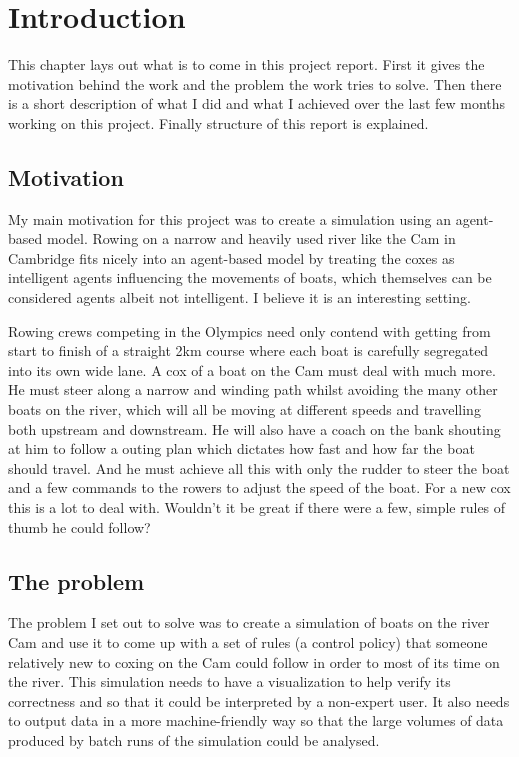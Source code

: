 \chapter{Introduction}\label{chapter:intro}
  This chapter lays out what is to come in this project report. First it gives the motivation behind the work and the problem the work tries to solve. Then there is a short description of what I did and what I achieved over the last few months working on this project. Finally structure of this report is explained.

  \section{Motivation}
  My main motivation for this project was to create a simulation using an agent-based model. Rowing on a narrow and heavily used river like the Cam in Cambridge fits nicely into an agent-based model by treating the coxes as intelligent agents influencing the movements of boats, which themselves can be considered agents albeit not intelligent. I believe it is an interesting setting.

  Rowing crews competing in the Olympics need only contend with getting from start to finish of a straight 2km course where each boat is carefully segregated into its own wide lane.
  A cox of a boat on the Cam must deal with much more. He must steer along a narrow and
  winding path whilst avoiding the many other boats on the river, which will all be moving at different speeds and travelling both upstream and downstream. He will also
  have a coach on the bank shouting at him to follow a outing plan
  which dictates how fast and how far the boat should travel. And he
  must achieve all this with only the rudder to steer the boat and a few commands to the rowers to adjust the speed of the boat. For a new cox this is a lot to deal with. Wouldn't it be great if there were a few, simple rules of thumb he could follow?
  
  \section{The problem}
  The problem I set out to solve was to create a simulation of boats on the river Cam and use it to come up with a set of rules (a control policy) that someone relatively new to coxing on the Cam could follow in order to most of its time on the river. This simulation needs to have a visualization to help verify its correctness and so that it could be interpreted by a non-expert user. It also needs to output data in a more machine-friendly way so that the large volumes of data produced by batch runs of the simulation could be analysed.
  
